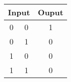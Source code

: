 \documentclass{standalone}
\begin{document}
	\begin{tabular}{ccc}
		\toprule
			\multicolumn{2}{c}{Input} & Ouput\\
		\midrule
			0 & 0 & 1\\
			0 & 1 & 0\\
			1 & 0 & 0\\
			1 & 1 & 0\\
		\bottomrule
	\end{tabular}
\end{document}

